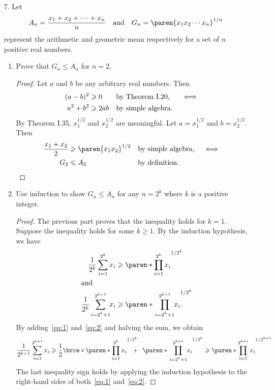 \documentclass[a4paper]{article}
\begin{document}
\begin{enumerate}
\item[7.\footnotemark]  Let
  \[
    A_n = \frac{x_1 + x_2 + \dotsb + x_n}{n} \quad \text{and} \quad
    G_n = \paren{x_1 x_2 \dotsm x_n}^{1/n}
  \]
  represent the arithmetic and geometric mean respectively for a set
  of \(n\) positive real numbers.
  \begin{enumerate}
  \item Prove that \(G_n \le A_n\) for \(n = 2\).

    \begin{proof}
      Let \(a\) and \(b\) be any arbitrary real numbers.  Then
      \begin{align*}
        (a - b)^2 &\ge 0   && \reason{by Theorem I.20, }  && \iff \\
        a^2 + b^2 &\ge 2ab && \reason{by simple algebra.}
      \end{align*}
      By Theorem I.35, \(x_1^{1/2}\) and \(x_2^{1/2}\) are meaningful.
      Let \(a = x_1^{1/2}\) and \(b = x_2^{1/2}\).  Then
      \begin{align*}
        \frac{x_1 + x_2}{2} &\ge \paren{x_1 x_2}^{1/2} && \reason{by simple algebra,} && \iff \\
        G_2 &\le A_2                                   && \reason{by definition.} && \qedhere
      \end{align*}
    \end{proof}

  \item Use induction to show \(G_n \le A_n\) for any \(n = 2^k\)
    where \(k\) is a positive integer.

    \begin{proof}
      The previous part proves that the inequality holds for
      \(k = 1\).  Suppose the inequality holds for some \(k \ge 1\).
      By the induction hypothesis, we have
      \begin{align}
        \label{eq:1}
        \frac{1}{2^k} \sum_{i=1}^{2^k} x_i
          &\ge \paren*{\prod_{i=1}^{2^k} x_i}^{1/2^k} \\
        \intertext{and}
        \label{eq:2}
        \frac{1}{2^k} \mspace{9mu} \sum_{\mathclap{i=2^k+1}}^{2^{k+1}} \mspace{4mu} x_i
          &\ge \paren*{\mspace{12mu} \prod_{\mathclap{i=2^k+1}}^{2^{k+1}} \mspace{5mu} x_i}^{\mathrlap{1/2^k}}.
      \end{align}
      By adding~\eqref{eq:1} and~\eqref{eq:2} and halving the sum, we obtain
      \begin{displaymath}
        \frac{1}{2^{k+1}} \sum_{i=1}^{2^{k+1}} x_i
        \ge \frac12 \brce*{\paren*{\prod_{i=1}^{2^k} x_i}^{\mathrlap{1/2^k}} \mspace{12mu} + \mspace{9mu} \paren*{\mspace{12mu} \prod_{\mathclap{i=2^k+1}}^{2^{k+1}} \mspace{5mu} x_i}^{1/2^k}}
        \ge \paren*{\prod_{i=1}^{2^{k+1}} x_i}^{1/2^{k+1}}
      \end{displaymath}
      The last inequality sign holds by applying the induction hypothesis to
      the right-hand sides of both~\eqref{eq:1} and~\eqref{eq:2}.
    \end{proof}
    

\end{enumerate}
\end{enumerate}
\end{document}
